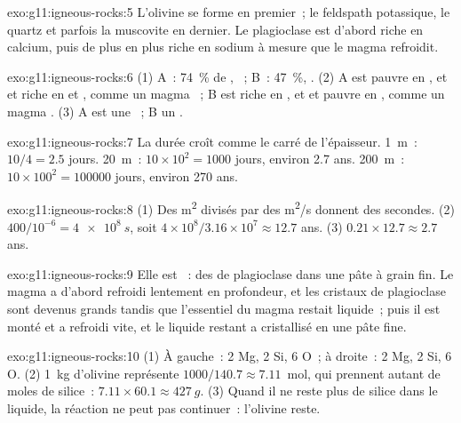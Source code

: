 \begin{solution}{exo:g11:igneous-rocks:5}
L'olivine se forme en premier~; le feldspath potassique, le quartz et
parfois la muscovite en dernier. Le plagioclase est d'abord riche en
calcium, puis de plus en plus riche en sodium à mesure que le magma
refroidit.
\end{solution}

\begin{solution}{exo:g11:igneous-rocks:6}
(1) A~: \qty{74}{\percent} de , ~; B~: \qty{47}{\percent},
. (2) A est pauvre en ,  et  et riche en
 et , comme un magma ~; B est riche en ,
 et  et pauvre en , comme un magma . (3) A
est une ~; B un .
\end{solution}

\begin{solution}{exo:g11:igneous-rocks:7}
La durée croît comme le carré de l'épaisseur. \qty{1}{m}~: $10/4 = 2.5$
jours. \qty{20}{m}~: $10 \times 10^2 = 1000$ jours, environ 2.7 ans.
\qty{200}{m}~: $10 \times 100^2 = \num{100000}$ jours, environ 270 ans.
\end{solution}

\begin{solution}{exo:g11:igneous-rocks:8}
(1) Des \unit{m^2} divisés par des \unit{m^2/s} donnent des secondes.
(2) $400/10^{-6} =
\qty{4e8}{s}$, soit $4 \times 10^8 / 3.16 \times 10^7 \approx 12.7$ ans. (3) $0.21 \times 12.7 \approx 2.7$ ans.
\end{solution}

\begin{solution}{exo:g11:igneous-rocks:9}
Elle est ~: des  de plagioclase dans une pâte à
grain fin. Le magma a d'abord refroidi lentement en profondeur, et les
cristaux de plagioclase sont devenus grands tandis que l'essentiel du magma
restait liquide~; puis il est monté et a refroidi vite, et le liquide
restant a cristallisé en une pâte fine.
\end{solution}

\begin{solution}{exo:g11:igneous-rocks:10}
(1) À gauche~: 2 Mg, 2 Si, 6 O~; à droite~: 2 Mg, 2 Si, 6 O. (2) \qty{1}{kg}
d'olivine représente $1000/140.7 \approx 7.11$~mol, qui prennent autant de
moles de silice~: $7.11 \times 60.1 \approx \qty{427}{g}$. (3) Quand il ne
reste plus de silice dans le liquide, la réaction ne peut pas continuer~:
l'olivine reste.
\end{solution}

